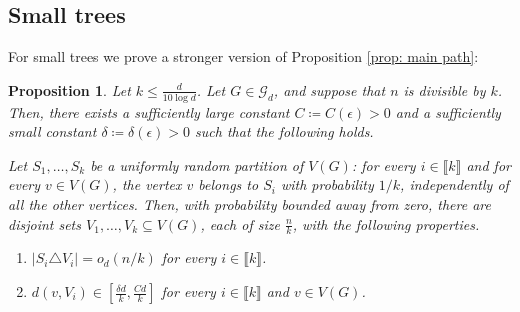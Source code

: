 \documentclass[notitlepage]{scrartcl}
\newcommand{\br}[1]{\llbracket{#1}\rrbracket}
\newtheorem{proposition}[thm]{Proposition}
\begin{document}
\subsection{Small trees}\label{s: small prop}
For small trees we prove a stronger version of Proposition \ref{prop: main path}:
\begin{proposition}\label{prop: main small k}
Let $k\le \frac{d}{10\log d}$. Let $G\in \mathcal{G}_d$, and suppose that $n$ is divisible by $k$. Then, there exists a sufficiently large constant $C\coloneqq C(\epsilon)>0$ and a sufficiently small constant $\delta\coloneqq \delta(\epsilon)>0$ such that the following holds.

Let $S_1,\ldots, S_k$ be a uniformly random partition of $V(G)$: for every $i\in\br{k}$ and for every $v\in V(G)$, the vertex $v$ belongs to $S_i$ with probability $1/k$, independently of all the other vertices. Then, with probability bounded away from zero, there are disjoint sets $V_1,\ldots, V_k\subseteq V(G)$, each of size $\frac{n}{k}$, with the following properties.
\begin{enumerate}[(P\arabic*{})]
    \item $|S_i\triangle V_i|=o_d(n/k)$ for every $i\in \br{k}$. \label{p: close to uniform small}
    \item $d(v,V_i)\in \left[\frac{\delta d}{k},\frac{Cd}{k}\right]$ for every $i\in \br{k}$ and $v\in V(G)$. \label{p: good degree between small}
\end{enumerate}
\end{proposition}
\end{document}
